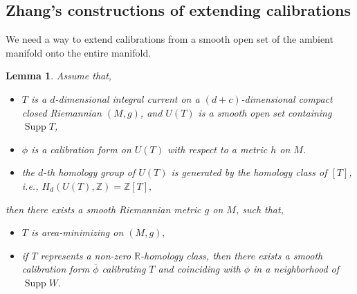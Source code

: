 \documentclass[11pt,a4paper]{amsart}
\numberwithin{equation}{section}
\newcommand{\supp}{\operatorname{Supp}}
\newcommand{\ov}[1]{\overline{#1}}
\newcommand{\R}{\mathbb{R}}
\newcommand{\Z}{\mathbb{Z}}
\theoremstyle{plain}
\newtheorem{lem}[exam]{Lemma}
\theoremstyle{definition}
\numberwithin{equation}{subsection}
\begin{document}
	\subsection{Zhang's constructions of extending calibrations}We need a way to extend calibrations from a smooth open set of the ambient manifold onto the entire manifold.
	\begin{lem}\label{lemzhang}
		Assume that,
		\begin{itemize}
			\item 	$T$ is a $d$-dimensional integral current on a $(d+c)$-dimensional compact closed Riemannian $(M,g)$, and $U(T)$ is a smooth open set containing $\supp T$,
			\item $\phi$ is a calibration form on $U(T)$ with respect to a metric $h$ on $M$.
			\item the $d$-th homology group of $U(T)$ is generated by the homology class of $[T]$, i.e., $H_d(U(T),\Z)=\Z[T],$
		\end{itemize}	 then there exists a smooth Riemannian metric $g$ on $M$, such that,
		\begin{itemize}
			\item $T$ is area-minimizing on $(M,g),$
			\item if $T$ represents a non-zero $\R$-homology class, then there exists a smooth calibration form $\ov{\phi}$ calibrating $T$ and coinciding with $\phi$ in a neighborhood of $\supp W$. 
		\end{itemize}
	\end{lem}
\end{document}
